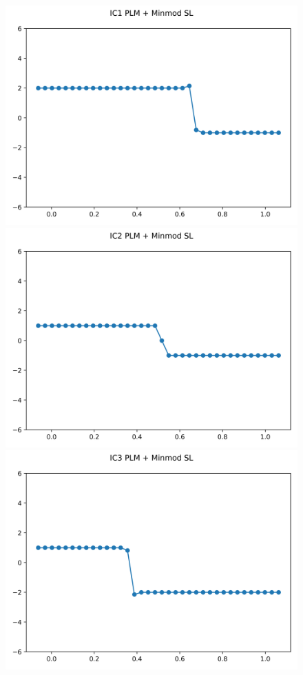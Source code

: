 \documentclass{article}
\begin{document}
\begin{figure}[t]
    \emp
        \centering
        \includegraphics[width=.95\textwidth]{../../code/unsafe_IC1Methodpm_plot.png}
        \includegraphics[width=.95\textwidth]{../../code/unsafe_IC2Methodpm_plot.png}
        \includegraphics[width=.95\textwidth]{../../code/unsafe_IC3Methodpm_plot.png}

\end{figure}
\end{document}
